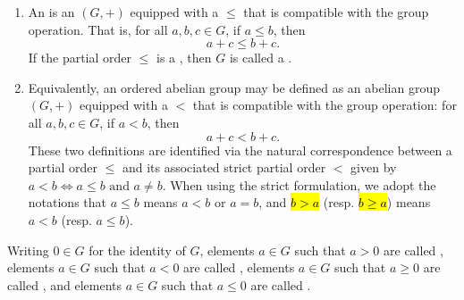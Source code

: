 \begin{definition} \label{definition:ordered_abelian_group}
    \begin{enumerate}
        \item An  is an  $(G,+)$ equipped with a  $\leq$ that is compatible with the group operation. That is, for all $a,b,c \in G$, if $a \leq b$, then
        $$a + c \leq b + c.$$
        If the partial order $\leq$ is a , then $G$ is called a .

        \item Equivalently, an ordered abelian group may be defined as an abelian group $(G,+)$ equipped with a  $<$ that is compatible with the group operation: for all $a,b,c \in G$, if $a < b$, then
        $$a + c < b + c.$$
        These two definitions are identified via the natural correspondence between a partial order $\leq$ and its associated strict partial order $<$ given by $a < b \iff a \leq b \text{ and } a \neq b$. When using the strict formulation, we adopt the notations that $a \leq b$ means $a < b$ or $a = b$, and \hl{$b > a$} (resp. \hl{$b \geq a$}) means $a < b$ (resp. $a \leq b$).
    \end{enumerate}

    Writing $0 \in G$ for the identity of $G$, elements $a \in G$ such that $a > 0$ are called , elements $a \in G$ such that $a < 0$ are called , elements $a \in G$ such that $a \geq 0$ are called , and elements $a \in G$ such that $a \leq 0$ are called .
\end{definition}